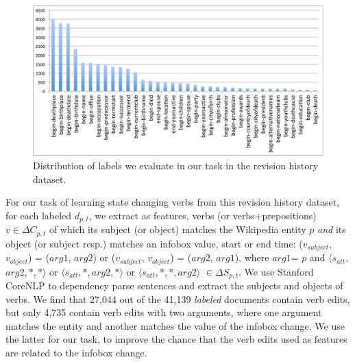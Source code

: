 \begin{figure}[t]
\begin{center}
\includegraphics[width=15cm,keepaspectratio=true]{figures/distribution.pdf}
\caption{\label{fig:distribution} Distribution of labels we evaluate in our task in the revision history dataset.}
\end{center}
\end{figure}

For our task of learning state changing verbs from this revision history dataset, for each labeled $d_{p,t}$, we extract as features, verbs (or verbs+prepositions) $v \in \Delta C_{p, t}$ of which its subject (or object) matches the Wikipedia entity $p$ \textit{and} its object (or subject resp.) matches an infobox value, start or end time: ($v_{subject}$, $v_{object}$) = (\scriptsize$arg1$\normalsize, \scriptsize$arg2$\normalsize) or ($v_{subject}$, $v_{object}$) = (\scriptsize$arg2$\normalsize,  \scriptsize$arg1$\normalsize), where \scriptsize$arg1$\normalsize = $p$ and $\langle s_{att}, $\scriptsize$arg2$\normalsize$, *, *\rangle$ or $\langle s_{att}, *, $\scriptsize$arg2$\normalsize$, *\rangle$ or $\langle s_{att}, *, *, $\scriptsize$arg2$\normalsize$\rangle$ $\in \Delta S_{p, t}$. We use Stanford CoreNLP \cite{manning-EtAl:2014:P14-5} to dependency parse sentences and extract the subjects and objects of verbs. We find that 27,044 out of the 41,139 \textit{labeled} documents contain verb edits, but only 4,735 contain verb edits with two arguments, where one argument matches the entity and another matches the value of the infobox change. We use the latter for our task, to improve the chance that the verb edits used as features are related to the infobox change. 


